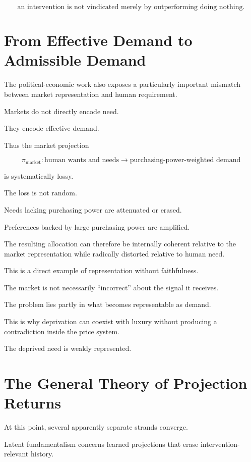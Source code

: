 \documentclass[11pt]{article}
\theoremstyle{remark}
\begin{document}
\begin{equation}
\boxed{
\text{an intervention is not vindicated merely by outperforming doing nothing}.
}
\end{equation}

\section{From Effective Demand to Admissible Demand}

The political-economic work also exposes a particularly important mismatch between market representation and human requirement.

Markets do not directly encode need.

They encode effective demand.

Thus the market projection

\begin{equation}
\pi_{\mathrm{market}}
:
\text{human wants and needs}
\rightarrow
\text{purchasing-power-weighted demand}
\end{equation}

is systematically lossy.

The loss is not random.

Needs lacking purchasing power are attenuated or erased.

Preferences backed by large purchasing power are amplified.

The resulting allocation can therefore be internally coherent relative to the market representation while radically distorted relative to human need.

This is a direct example of representation without faithfulness.

The market is not necessarily ``incorrect'' about the signal it receives.

The problem lies partly in what becomes representable as demand.

This is why deprivation can coexist with luxury without producing a contradiction inside the price system.

The deprived need is weakly represented.

\section{The General Theory of Projection Returns}

At this point, several apparently separate strands converge.

Latent fundamentalism concerns learned projections that erase intervention-relevant history.
\end{document}

